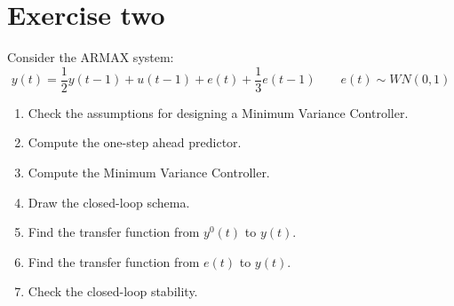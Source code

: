 \section{Exercise two}

Consider the ARMAX system: 
\[y(t)=\dfrac{1}{2}y(t-1)+u(t-1)+e(t)+\dfrac{1}{3}e(t-1)\qquad e(t)\sim WN(0,1)\]
\begin{enumerate}
    \item Check the assumptions for designing a Minimum Variance Controller.
    \item Compute the one-step ahead predictor.
    \item Compute the Minimum Variance Controller.
    \item Draw the closed-loop schema.
    \item Find the transfer function from $y^0(t)$ to $y(t)$.
    \item Find the transfer function from $e(t)$ to $y(t)$.
    \item Check the closed-loop stability.
\end{enumerate}

